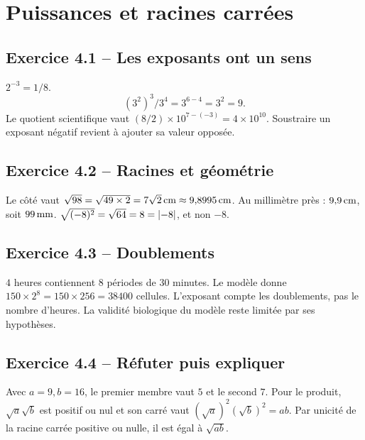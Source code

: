 \chapter{Puissances et racines carrées}
\label{corriges:04}
\section*{Exercice 4.1 -- Les exposants ont un sens}
$2^{-3}=1/8$.
\[(3^2)^3/3^4=3^{6-4}=3^2=9.\]
Le quotient scientifique vaut $(8/2)\times10^{7-(-3)}=4\times10^{10}$. Soustraire un exposant négatif revient à ajouter sa valeur opposée.

\section*{Exercice 4.2 -- Racines et géométrie}
Le côté vaut $\sqrt{98}=\sqrt{49\times2}=7\sqrt2\,\mathrm{cm}\approx9{,}8995\,\mathrm{cm}$. Au millimètre près : $9{,}9\,\mathrm{cm}$, soit $99\,\mathrm{mm}$.
$\sqrt{(-8)^2}=\sqrt{64}=8=\left|-8\right|$, et non $-8$.

\section*{Exercice 4.3 -- Doublements}
$4$ heures contiennent $8$ périodes de $30$ minutes. Le modèle donne $150\times2^8=150\times256=38400$ cellules. L'exposant compte les doublements, pas le nombre d'heures. La validité biologique du modèle reste limitée par ses hypothèses.

\section*{Exercice 4.4 -- Réfuter puis expliquer}
Avec $a=9,b=16$, le premier membre vaut $5$ et le second $7$. Pour le produit, $\sqrt a\sqrt b$ est positif ou nul et son carré vaut $(\sqrt a)^2(\sqrt b)^2=ab$. Par unicité de la racine carrée positive ou nulle, il est égal à $\sqrt{ab}$.
